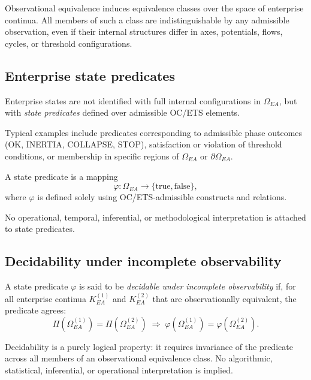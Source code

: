 Observational equivalence induces equivalence classes over the space of
enterprise continua. All members of such a class are indistinguishable
by any admissible observation, even if their internal structures differ
in axes, potentials, flows, cycles, or threshold configurations.

\subsection{Enterprise state predicates}
\label{subsec:state-predicates}

Enterprise states are not identified with full internal configurations
in $\Omega_{EA}$, but with \emph{state predicates} defined over
admissible OC/ETS elements.

Typical examples include predicates corresponding to admissible phase
outcomes (OK, INERTIA, COLLAPSE, STOP), satisfaction or violation of
threshold conditions, or membership in specific regions of
$\Omega_{EA}$ or $\partial\Omega_{EA}$.

\begin{definition}
A state predicate is a mapping
\[
\varphi : \Omega_{EA} \to \{\text{true},\text{false}\},
\]
where $\varphi$ is defined solely using OC/ETS-admissible constructs and
relations.
\end{definition}

No operational, temporal, inferential, or methodological interpretation
is attached to state predicates.

\subsection{Decidability under incomplete observability}
\label{subsec:decidability}

\begin{definition}[Decidability]
A state predicate $\varphi$ is said to be \emph{decidable under
incomplete observability} if, for all enterprise continua
$K_{EA}^{(1)}$ and $K_{EA}^{(2)}$ that are observationally equivalent,
the predicate agrees:
\[
\Pi\!\left(\Omega_{EA}^{(1)}\right)
=
\Pi\!\left(\Omega_{EA}^{(2)}\right)
\;\Rightarrow\;
\varphi\!\left(\Omega_{EA}^{(1)}\right)
=
\varphi\!\left(\Omega_{EA}^{(2)}\right).
\]
\end{definition}

Decidability is a purely logical property: it requires invariance of the
predicate across all members of an observational equivalence class. No
algorithmic, statistical, inferential, or operational interpretation is
implied.

